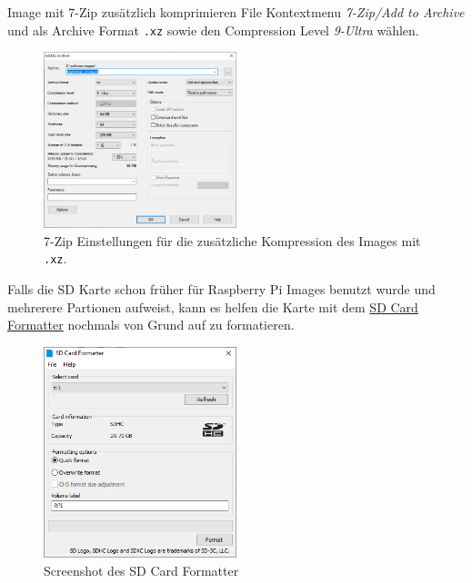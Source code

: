 \documentclass[
  11pt,
  a4paperpaper,
  oneside, openany  ,captions=tableheading
]{scrbook}
\theoremstyle{definition}
\theoremstyle{remark}
\begin{document}
Image mit 7-Zip zusätzlich komprimieren File Kontextmenu \emph{7-Zip/Add
to Archive} und als Archive Format \texttt{.xz} sowie den Compression
Level \emph{9-Ultra} wählen.

\begin{figure}[H]

{\centering \includegraphics[width=0.5\textwidth,height=\textheight]{images/raspberrypi_image_verkleinern_05.png}

}

\caption{7-Zip Einstellungen für die zusätzliche Kompression des Images
mit \texttt{.xz}.}

\end{figure}%

Falls die SD Karte schon früher für Raspberry Pi Images benutzt wurde
und mehrerere Partionen aufweist, kann es helfen die Karte mit dem
\href{https://www.sdcard.org/downloads/formatter/}{SD Card Formatter}
nochmals von Grund auf zu formatieren.

\begin{figure}[H]

{\centering \includegraphics[width=0.5\textwidth,height=\textheight]{images/raspberrypi_image_verkleinern_06.png}

}

\caption{Screenshot des SD Card Formatter}

\end{figure}%

\backmatter

\printindex
\end{document}
